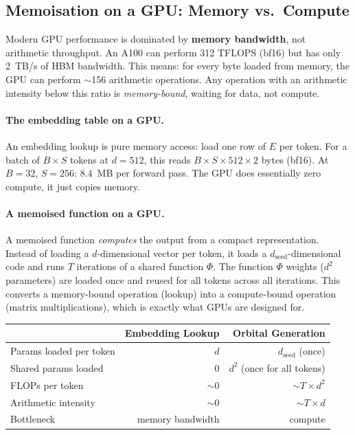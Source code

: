 \documentclass[11pt, a4paper]{article}
\theoremstyle{remark}
\begin{document}
\subsection{Memoisation on a GPU: Memory vs.\ Compute}

Modern GPU performance is dominated by \textbf{memory bandwidth}, not arithmetic throughput.
An A100 can perform 312 TFLOPS (bf16) but has only 2~TB/s of HBM bandwidth.
This means: for every byte loaded from memory, the GPU can perform $\sim$156 arithmetic operations.
Any operation with an arithmetic intensity below this ratio is \emph{memory-bound}, waiting for data, not compute.

\paragraph{The embedding table on a GPU.}
An embedding lookup is pure memory access: load one row of $E$ per token.
For a batch of $B \times S$ tokens at $d = 512$, this reads $B \times S \times 512 \times 2$ bytes (bf16).
At $B{=}32$, $S{=}256$: 8.4~MB per forward pass.
The GPU does essentially zero compute, it just copies memory.

\paragraph{A memoised function on a GPU.}
A memoised function \emph{computes} the output from a compact representation.
Instead of loading a $d$-dimensional vector per token, it loads a $d_{\text{seed}}$-dimensional code and runs $T$ iterations of a shared function $\Phi$.
The function $\Phi$ weights ($d^2$ parameters) are loaded once and reused for all tokens across all iterations.
This converts a memory-bound operation (lookup) into a compute-bound operation (matrix multiplications), which is exactly what GPUs are designed for.

\begin{center}\small
\begin{tabular}{@{}lrr@{}}
\toprule
& \textbf{Embedding Lookup} & \textbf{Orbital Generation} \\
\midrule
Params loaded per token & $d$ & $d_{\text{seed}}$ (once) \\
Shared params loaded & 0 & $d^2$ (once for all tokens) \\
FLOPs per token & $\sim 0$ & $\sim T \times d^2$ \\
Arithmetic intensity & $\sim 0$ & $\sim T \times d$ \\
Bottleneck & memory bandwidth & compute \\
\bottomrule
\end{tabular}
\end{center}
\end{document}
